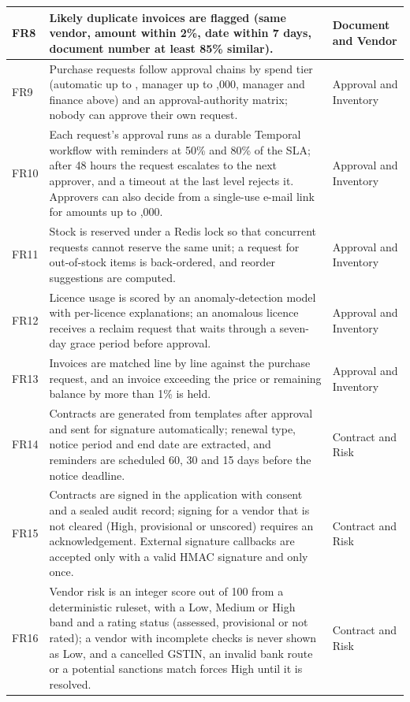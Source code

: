 {\begin{longtable}{|L{0.07\textwidth}|L{0.64\textwidth}|L{0.17\textwidth}|}
FR8 & Likely duplicate invoices are flagged (same vendor, amount within 2\%, date within 7 days, document number at least 85\% similar). & Document and Vendor \\ \hline
FR9 & Purchase requests follow approval chains by spend tier (automatic up to , manager up to ,000, manager and finance above) and an approval-authority matrix; nobody can approve their own request. & Approval and Inventory \\ \hline
FR10 & Each request's approval runs as a durable Temporal workflow with reminders at 50\% and 80\% of the SLA; after 48 hours the request escalates to the next approver, and a timeout at the last level rejects it. Approvers can also decide from a single-use e-mail link for amounts up to ,000. & Approval and Inventory \\ \hline
FR11 & Stock is reserved under a Redis lock so that concurrent requests cannot reserve the same unit; a request for out-of-stock items is back-ordered, and reorder suggestions are computed. & Approval and Inventory \\ \hline
FR12 & Licence usage is scored by an anomaly-detection model with per-licence explanations; an anomalous licence receives a reclaim request that waits through a seven-day grace period before approval. & Approval and Inventory \\ \hline
FR13 & Invoices are matched line by line against the purchase request, and an invoice exceeding the price or remaining balance by more than 1\% is held. & Approval and Inventory \\ \hline
FR14 & Contracts are generated from templates after approval and sent for signature automatically; renewal type, notice period and end date are extracted, and reminders are scheduled 60, 30 and 15 days before the notice deadline. & Contract and Risk \\ \hline
FR15 & Contracts are signed in the application with consent and a sealed audit record; signing for a vendor that is not cleared (High, provisional or unscored) requires an acknowledgement. External signature callbacks are accepted only with a valid HMAC signature and only once. & Contract and Risk \\ \hline
FR16 & Vendor risk is an integer score out of 100 from a deterministic ruleset, with a Low, Medium or High band and a rating status (assessed, provisional or not rated); a vendor with incomplete checks is never shown as Low, and a cancelled GSTIN, an invalid bank route or a potential sanctions match forces High until it is resolved. & Contract and Risk \\ \hline

\end{longtable}}
